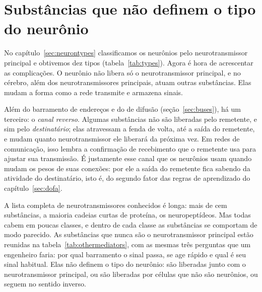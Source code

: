 \chapter{Substâncias que não definem o tipo do neurônio}
\label{sec:othermediators}

No capítulo~\ref{sec:neurontypes} classificamos os neurônios pelo neurotransmissor principal e obtivemos dez tipos (tabela~\ref{tab:types}). Agora é hora de acrescentar as complicações. O neurônio não libera só o neurotransmissor principal, e no cérebro, além dos neurotransmissores principais, atuam outras substâncias. Elas mudam a forma como a rede transmite e armazena sinais.

Além do barramento de endereços e do de difusão (seção~\ref{sec:buses}), há um terceiro: o \emph{canal reverso}. Algumas substâncias não são liberadas pelo remetente, e sim pelo \emph{destinatário}; elas atravessam a fenda de volta, até a saída do remetente, e mudam quanto neurotransmissor ele liberará da próxima vez. Em redes de comunicação, isso lembra a confirmação de recebimento que o remetente usa para ajustar sua transmissão. É justamente esse canal que os neurônios usam quando mudam os pesos de suas conexões: por ele a saída do remetente fica sabendo da atividade do destinatário, isto é, do segundo fator das regras de aprendizado do capítulo~\ref{sec:dofa}.

A lista completa de neurotransmissores conhecidos é longa: mais de cem substâncias, a maioria cadeias curtas de proteína, os neuropeptídeos. Mas todas cabem em poucas classes, e dentro de cada classe as substâncias se comportam de modo parecido. As substâncias que nunca são o neurotransmissor principal estão reunidas na tabela~\ref{tab:othermediators}, com as mesmas três perguntas que um engenheiro faria: por qual barramento o sinal passa, se age rápido e qual é seu sinal habitual. Elas não definem o tipo do neurônio: são liberadas junto com o neurotransmissor principal, ou são liberadas por células que não são neurônios, ou seguem no sentido inverso.

